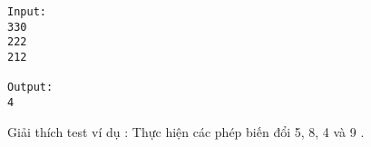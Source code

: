\begin{verbatim}
Input:
330
222
212

Output:
4
\end{verbatim}

Giải thích test ví dụ : Thực hiện các phép biến đổi 5, 8, 4 và 9 .